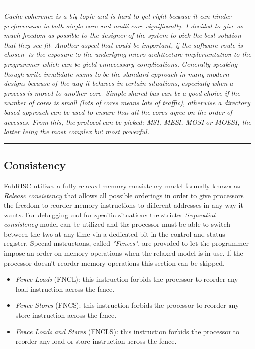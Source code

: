 \documentclass{article}
\begin{document}
        \par\noindent\rule{\textwidth}{0.4pt}
        \textit{Cache coherence is a big topic and is hard to get right because it can hinder performance in both single core and multi-core significantly. I decided to give as much freedom as possible to the designer of the system to pick the best solution that they see fit. Another aspect that could be important, if the software route is chosen, is the exposure to the underlying micro-architecture implementation to the programmer which can be yield unnecessary complications. Generally speaking though write-invalidate seems to be the standard approach in many modern designs because of the way it behaves in certain situations, especially when a process is moved to another core. Simple shared bus can be a good choice if the number of cores is small (lots of cores means lots of traffic), otherwise a directory based approach can be used to ensure that all the cores agree on the order of accesses. From this, the protocol can be picked: MSI, MESI, MOSI or MOESI, the latter being the most complex but most powerful.}
        \par\noindent\rule{\textwidth}{0.4pt}

        \subsection{Consistency}

            FabRISC utilizes a fully relaxed memory consistency model formally known as \textit{Release consistency} that allows all possible orderings in order to give processors the freedom to reorder memory instructions to different addresses in any way it wants. For debugging and for specific situations the stricter \textit{Sequential consistency} model can be utilized and the processor must be able to switch between the two at any time via a dedicated bit in the control and status register. Special instructions, called \textit{"Fences"}, are provided to let the programmer impose an order on memory operations when the relaxed model is in use. If the processor doesn't reorder memory operations this section can be skipped.

            \begin{itemize}

                \item \textit{Fence Loads} (FNCL): this instruction forbids the processor to reorder any load instruction across the fence.
                \item \textit{Fence Stores} (FNCS): this instruction forbids the processor to reorder any store instruction across the fence.
                \item \textit{Fence Loads and Stores} (FNCLS): this instruction forbids the processor to reorder any load or store instruction across the fence.

            \end{itemize}
\end{document}
